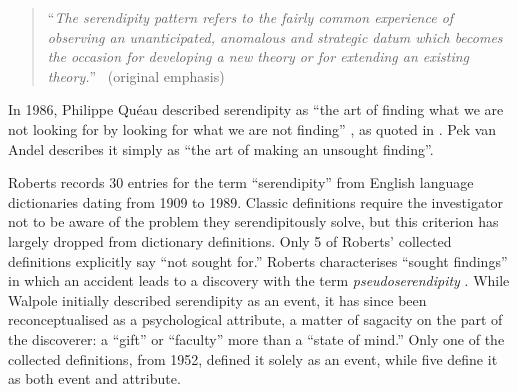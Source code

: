 \begin{quote}
``\emph{The serendipity pattern refers to the fairly common experience of observing an \emph{unanticipated}, \emph{anomalous} \emph{and strategic} datum which becomes the occasion for developing a new theory or for extending an existing theory.}''~\cite[p. 506]{merton1948bearing} (original emphasis)
\end{quote}

In 1986, Philippe Qu\'eau described serendipity as ``the art of
finding what we are not looking for by looking for what we are not
finding'' \cite{eloge-de-la-simulation}, as quoted in
\cite[p. 121]{Campos2002}.  Pek van Andel
\citeyear[p. 631]{van1994anatomy} describes it simply as ``the art of
making an unsought finding''.


Roberts \citeyear[pp. 246--249]{roberts} records 30 entries for the term ``serendipity'' from English language dictionaries dating from 1909 to 1989.  
%
Classic definitions require the investigator not to be aware of the problem they serendipitously solve, but this criterion has largely dropped from dictionary definitions. Only 5 of Roberts' collected definitions explicitly say ``not sought for.''  Roberts characterises ``sought findings'' in which an accident leads to a discovery with the term \emph{pseudoserendipity} \cite{chumaceiro1995serendipity}.
%
While Walpole initially described serendipity as an event, it has
since been reconceptualised as a psychological attribute, a matter of
sagacity on the part of the discoverer: a ``gift'' or ``faculty'' more
than a ``state of mind.''  Only one of the collected definitions, from
1952, defined it solely as an event, while five define it as both
event and attribute.

